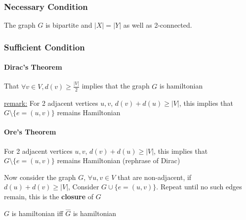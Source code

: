 \documentclass[12pt]{article}
\begin{document}
\subsubsection{Necessary Condition} 

The graph $G$ is bipartite and $|X| = |Y|$ as well as 2-connected.

\subsubsection{Sufficient Condition} 

\paragraph{Dirac's Theorem} That $\forall v \in V, d(v) \geq \frac{|V|}{2}$ implies that the graph $G$ is hamiltonian

\begin{tcolorbox}
	\underline{remark:} For 2 adjacent vertices $u,v$, $d(v) + d(u) \geq |V|$, this implies that $G \setminus \{ e=(u,v) \}$ remains Hamiltonian
\end{tcolorbox}

\paragraph{Ore's Theorem} For 2 adjacent vertices $u,v$, $d(v) + d(u) \geq |V|$, this implies that $G \setminus \{ e=(u,v) \}$ remains Hamiltonian (rephrase of Dirac)

Now consider the graph $G$, $\forall u,v \in V$ that are non-adjacent, if $d(u) + d(v) \geq |V|$, Consider $G \cup \{ e=(u,v) \}$. Repeat until no such edges remain, this is the \textbf{closure} of $G$

\begin{tcolorbox}[title=Bondy-Chvatal Theorem]
	$G$ is hamiltonian iff $\overset{\_\_\_}{G}$ is hamiltonian
\end{tcolorbox}
\end{document}
